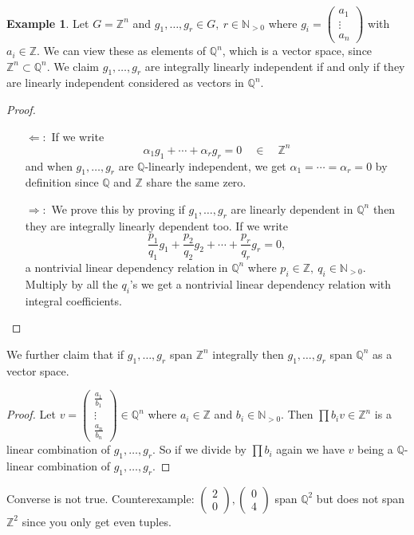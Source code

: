 \documentclass[a4paper]{article}
\theoremstyle{definition}
\newtheorem{example}[defn]{Example}
\begin{document}
\begin{example}
Let $G=\mathbb Z^n$ and $g_1,\ldots,g_r \in G,\ r\in \mathbb N_{>0}$ where $g_i = \begin{pmatrix}
    a_1 \\ \vdots \\ a_n
\end{pmatrix}$ with $a_i \in \mathbb Z$. We can view these as elements of $\mathbb Q^n$, which is a vector space, since $\mathbb Z^n \subset \mathbb Q^n$. We claim $g_1,\ldots,g_r$ are integrally linearly independent if and only if they are linearly independent considered as vectors in $\mathbb Q^n$.
\begin{proof}
\begin{itemize}
    \item[$\Leftarrow:$] If we write
    \[
    \alpha_1 g_1 + \cdots + \alpha_r g_r = 0 \quad \in \quad \mathbb Z^n
    \]
    and when $g_1,\ldots,g_r$ are $\mathbb Q$-linearly independent, we get $\alpha_1=\cdots=\alpha_r=0$ by definition since $\mathbb Q$ and $\mathbb Z$ share the same zero.
    \item[$\Rightarrow:$] We prove this by proving if $g_1,\ldots,g_r$ are linearly dependent in $\mathbb Q^n$ then they are integrally linearly dependent too. If we write
    \[
    \frac{p_1}{q_1} g_1 + \frac{p_2}{q_2} g_2 + \cdots + \frac{p_r}{q_r} g_r = 0,
    \]
    a nontrivial linear dependency relation in $\mathbb Q^n$ where $p_i \in \mathbb Z,\ q_i \in \mathbb N_{>0}$. Multiply by all the $q_i$'s we get a nontrivial linear dependency relation with integral coefficients.
\end{itemize}
\end{proof}
We further claim that if $g_1,\ldots,g_r$ span $\mathbb Z^n$ integrally then $g_1,\ldots,g_r$ span $\mathbb Q^n$ as a vector space.
\begin{proof}
Let $v=\begin{pmatrix}
    \frac{a_1}{b_1} \\ \vdots \\ \frac{a_n}{b_n}
\end{pmatrix} \in \mathbb Q^n$ where $a_i \in \mathbb Z$ and $b_i \in \mathbb N_{>0}$. Then $\prod b_i v \in \mathbb Z^n$ is a linear combination of $g_1,\ldots,g_r$. So if we divide by $\prod b_i$ again we have $v$ being a $\mathbb Q$-linear combination of $g_1,\ldots,g_r$.
\end{proof}
Converse is not true. Counterexample: $\begin{pmatrix}2 \\ 0\end{pmatrix},\begin{pmatrix}0 \\ 4\end{pmatrix}$ span $\mathbb Q^2$ but does not span $\mathbb Z^2$ since you only get even tuples.
\end{example}
\end{document}
